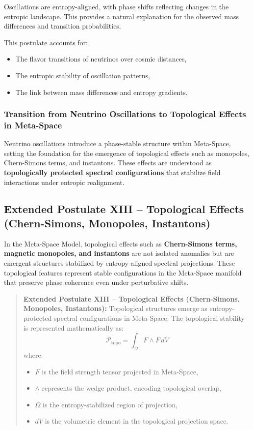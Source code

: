 \documentclass[10.5pt,a4paper]{article}
\begin{document}
Oscillations are entropy-aligned, with phase shifts reflecting changes in the entropic landscape. This provides 
a natural explanation for the observed mass differences and transition probabilities.

This postulate accounts for:
\begin{itemize}
    \item The flavor transitions of neutrinos over cosmic distances,
    \item The entropic stability of oscillation patterns,
    \item The link between mass differences and entropy gradients.
\end{itemize}

\subsubsection*{Transition from Neutrino Oscillations to Topological Effects in Meta-Space}

Neutrino oscillations introduce a phase-stable structure within Meta-Space, setting the foundation for 
the emergence of topological effects such as monopoles, Chern-Simons terms, and instantons. These effects 
are understood as \textbf{topologically protected spectral configurations} that stabilize field 
interactions under entropic realignment.

\subsection{Extended Postulate XIII – Topological Effects (Chern-Simons, Monopoles, Instantons)}

In the Meta-Space Model, topological effects such as \textbf{Chern-Simons terms, magnetic monopoles, and instantons} 
are not isolated anomalies but are emergent structures stabilized by entropy-aligned spectral projections. These 
topological features represent stable configurations in the Meta-Space manifold that preserve phase coherence 
even under perturbative shifts.

\begin{quote}
\textbf{Extended Postulate XIII – Topological Effects (Chern-Simons, Monopoles, Instantons):}  
Topological structures emerge as entropy-protected spectral configurations in Meta-Space. The topological 
stability is represented mathematically as:
\[
\mathcal{P}_{\text{topo}} = \int_\Omega F \wedge F \, dV
\]
where:
\begin{itemize}
    \item $F$ is the field strength tensor projected in Meta-Space,
    \item $\wedge$ represents the wedge product, encoding topological overlap,
    \item $\Omega$ is the entropy-stabilized region of projection,
    \item $dV$ is the volumetric element in the topological projection space.
\end{itemize}
\end{quote}
\end{document}
